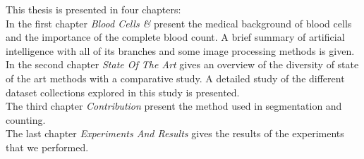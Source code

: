 This thesis is presented in four chapters:\\
In the first chapter \textit{Blood Cells \& }  present the medical background of blood cells and the importance of the complete blood count. A brief summary of artificial intelligence with all of its branches and some image processing methods is given.\\
In the second chapter \textit{State Of The Art} gives an overview of the diversity of state of the art methods with a comparative study. A  detailed study of the different dataset collections explored in this study is presented.\\
The third chapter \textit{Contribution} present the method used in segmentation and counting.\\
The last chapter \textit{Experiments And Results} gives the results of the experiments that we performed.

